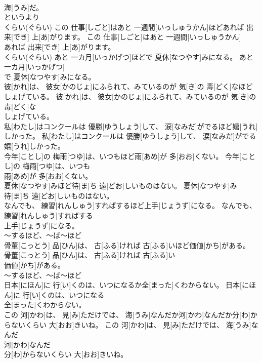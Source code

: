 \documentclass[8pt]{extreport}
\begin{document}
\begin{CJK}{UTF8}{min}
\\	海[うみ]だ。	
\\	というより 
\\	くらい(ぐらい)	この 仕事[しごと]はあと 一週間[いっしゅうかん]ほどあれば 出来[でき] 上[あ]がります。	この 仕事[しごと]はあと 一週間[いっしゅうかん]
\\	あれば 出来[でき] 上[あ]がります。	
\\	くらい(ぐらい)	あと 一カ月[いっかげつ]ほどで 夏休[なつやす]みになる。	あと 一カ月[いっかげつ]
\\	で 夏休[なつやす]みになる。	
\\	彼[かれ]は、 彼女[かのじょ]にふられて、みているのが 気[き]の 毒[どく]なほどしょげている。	彼[かれ]は、 彼女[かのじょ]にふられて、みているのが 気[き]の 毒[どく]な
\\	しょげている。	
\\	私[わたし]はコンクールは 優勝[ゆうしょう]して、 涙[なみだ]がでるほど嬉[うれ]しかった。	私[わたし]はコンクールは 優勝[ゆうしょう]して、 涙[なみだ]がでる
\\	嬉[うれ]しかった。	
\\	今年[ことし]の 梅雨[つゆ]は、いつもほど雨[あめ]が 多[おお]くない。	今年[ことし]の 梅雨[つゆ]は、いつも
\\	雨[あめ]が 多[おお]くない。	
\\	夏休[なつやす]みほど待[ま]ち 遠[どお]しいものはない。	夏休[なつやす]み
\\	待[ま]ち 遠[どお]しいものはない。	
\\	なんでも、 練習[れんしゅう]すればするほど上手[じょうず]になる。	なんでも、 練習[れんしゅう]すればする
\\	上手[じょうず]になる。	
\\	～するほど、～ば～ほど
\\	骨董[こっとう] 品[ひん]は、 古[ふる]ければ 古[ふる]いほど価値[かち]がある。	骨董[こっとう] 品[ひん]は、 古[ふる]ければ 古[ふる]い
\\	価値[かち]がある。	
\\	～するほど、～ば～ほど
\\	日本[にほん]に 行[い]くのは、いつになるか全[まった]くわからない。	日本[にほん]に 行[い]くのは、いつになる
\\	全[まった]くわからない。	
\\	この 河[かわ]は、 見[み]ただけでは、 海[うみ]なんだか河[かわ]なんだか分[わ]からないくらい 大[おお]きいね。	この 河[かわ]は、 見[み]ただけでは、 海[うみ]なんだ
\\	河[かわ]なんだ
\\	分[わ]からないくらい 大[おお]きいね。	

\end{CJK}
\end{document}
